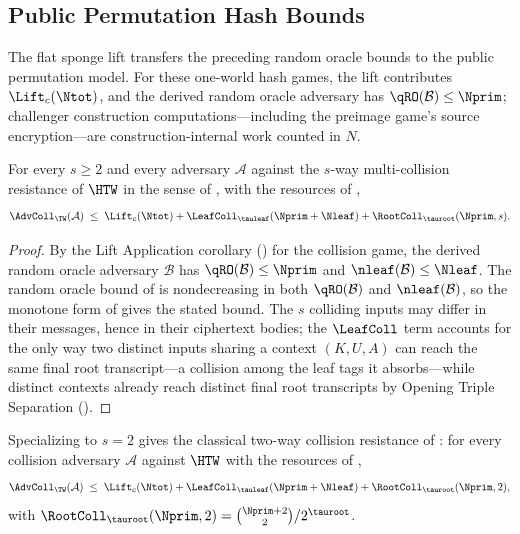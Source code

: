 \subsection{Public Permutation Hash Bounds}
\label{sec:root-tag-pp}

The flat sponge lift transfers the preceding random oracle bounds to the public
permutation model. For these one-world hash games, the lift contributes
$\Lift_c(\Ntot)$, and the derived random oracle adversary has
$\qRO(\mathcal{B}) \leq \Nprim$; challenger construction
computations---including the preimage game's source encryption---are
construction-internal work counted in $N$.

\begin{theorem}
\label{thm:coll}
For every $s \geq 2$ and every adversary $\mathcal{A}$ against the $s$-way
multi-collision resistance of $\HTW$ in the sense of \cite{BH22}, with the
resources of ,
\[
  \AdvColl_\TW(\mathcal{A})
  \;\leq\;
  \Lift_c(\Ntot)
  + \LeafColl_{\tauleaf}(\Nprim+\Nleaf)
  + \RootColl_{\tauroot}(\Nprim, s).
\]
\end{theorem}

\begin{proof}
By the Lift Application corollary () for the
collision game, the derived random oracle adversary $\mathcal{B}$ has
$\qRO(\mathcal{B}) \leq \Nprim$ and $\nleaf(\mathcal{B}) \leq \Nleaf$. The
random oracle bound of  is nondecreasing in both
$\qRO(\mathcal{B})$ and $\nleaf(\mathcal{B})$, so the monotone form of
 gives the stated bound. The $s$ colliding
inputs may differ in their messages, hence in their ciphertext bodies; the
$\LeafColl$ term accounts for the only way two distinct inputs sharing a
context $(K, U, A)$ can reach the same final root transcript---a collision
among the leaf tags it absorbs---while distinct contexts already reach
distinct final root transcripts by Opening Triple Separation
().
\end{proof}

\begin{corollary}
\label{cor:coll-rs04}
Specializing  to $s = 2$ gives the classical two-way
collision resistance of \cite{RS04}: for every collision adversary
$\mathcal{A}$ against $\HTW$ with the resources of ,
\[
  \AdvColl_\TW(\mathcal{A})
  \;\leq\;
  \Lift_c(\Ntot)
  + \LeafColl_{\tauleaf}(\Nprim+\Nleaf)
  + \RootColl_{\tauroot}(\Nprim, 2),
\]
with $\RootColl_{\tauroot}(\Nprim, 2) = \binom{\Nprim + 2}{2} / 2^{\tauroot}$.
\end{corollary}

